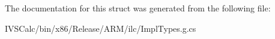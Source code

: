 The documentation for this struct was generated from the following file\+:\begin{DoxyCompactItemize}
\item 
I\+V\+S\+Calc/bin/x86/\+Release/\+A\+R\+M/ilc/Impl\+Types.\+g.\+cs\end{DoxyCompactItemize}
